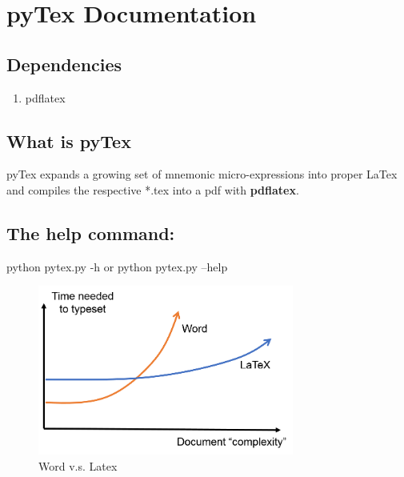 \documentclass{article}
\begin{document}
\section*{pyTex Documentation}
\subsection*{Dependencies}
\begin{enumerate}
\item pdflatex
\end{enumerate}
\subsection*{What is pyTex}
pyTex expands a growing set of mnemonic micro-expressions into proper LaTex and compiles the respective *.tex into a pdf with \textbf{pdflatex}.
\subsection*{The help command:}
\begin{tcolorbox}
python pytex.py -h \quad or \quad python pytex.py --help
\end{tcolorbox}
\begin{figure}[H]
  \begin{center}
    \includegraphics[width=0.75\textwidth]{word_vs_latex.png}
    \caption{Word v.s. Latex}
    \label{label}
  \end{center}
\end{figure}
\end{document}
